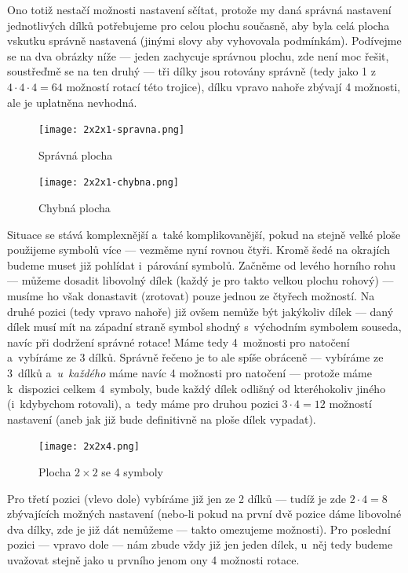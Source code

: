 \documentclass[11pt, titlepage]{report}
\begin{document}
Ono totiž nestačí možnosti nastavení sčítat, protože my daná správná nastavení jednotlivých dílků potřebujeme pro celou plochu současně, aby byla celá plocha vskutku správně nastavená (jinými slovy aby vyhovovala podmínkám). Podívejme se na dva obrázky níže --- jeden zachycuje správnou plochu, zde není moc řešit, soustřeďmě se na ten druhý --- tři dílky jsou rotovány správně (tedy jako 1 z~$4 \cdot 4 \cdot 4 = 64$ možností rotací této trojice), dílku vpravo nahoře zbývají 4 možnosti, ale je uplatněna nevhodná.

\begin{figure}[ht]
\centering
\begin{minipage}[b]{0.4\linewidth}
\centering
\texttt{[image: 2x2x1-spravna.png]}
\caption{Správná plocha}
\end{minipage}
\begin{minipage}[b]{0.4\linewidth}
\centering
\texttt{[image: 2x2x1-chybna.png]}
\caption{Chybná plocha}
\end{minipage}
\end{figure}

Situace se stává komplexnější a~také komplikovanější, pokud na stejně velké ploše použijeme symbolů více --- vezměme nyní rovnou čtyři. Kromě šedé na okrajích budeme muset již pohlídat i~párování symbolů. Začněme od levého horního rohu --– můžeme dosadit libovolný dílek (každý je pro takto velkou plochu rohový) --- musíme ho však donastavit (zrotovat) pouze jednou ze čtyřech možností. Na druhé pozici (tedy vpravo nahoře) již ovšem nemůže být jakýkoliv dílek --– daný dílek musí mít na západní straně symbol shodný s~východním symbolem souseda, navíc při dodržení správné rotace! Máme tedy 4~možnosti pro natočení a~vybíráme ze 3 dílků. Správně řečeno je to ale spíše obráceně --- vybíráme ze 3~dílků a~\emph{u~každého} máme navíc 4 možnosti pro natočení --- protože máme k~dispozici celkem 4~symboly, bude každý dílek odlišný od kteréhokoliv jiného (i~kdybychom rotovali), a~tedy máme pro druhou pozici $3 \cdot 4 = 12$ možností nastavení (aneb jak již bude definitivně na ploše dílek vypadat).

\begin{figure}[ht]
\centering
\texttt{[image: 2x2x4.png]}
\caption{Plocha $2 \times 2$ se 4 symboly}
\end{figure}

Pro třetí pozici (vlevo dole) vybíráme již jen ze 2 dílků --- tudíž je zde $2 \cdot 4 = 8$ zbývajících možných nastavení (nebo-li pokud na první dvě pozice dáme libovolné dva dílky, zde je již dát nemůžeme --- takto omezujeme možnosti). Pro poslední pozici --- vpravo dole --- nám zbude vždy již jen jeden dílek, u~něj tedy budeme uvažovat stejně jako u prvního jenom ony 4 možnosti rotace.
\end{document}

